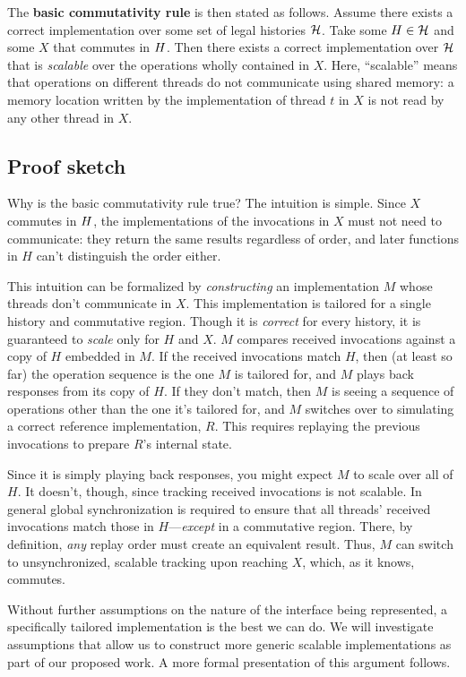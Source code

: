 The \textbf{basic commutativity rule} is then stated as follows.
%
Assume there exists a correct implementation over some set of legal
histories $\mathcal{H}$.
%
Take some $H \in \mathcal{H}$ and some $X$ that commutes in
$H$.
%
Then there exists a correct implementation over $\mathcal{H}$
that is \emph{scalable} over the operations wholly
contained in $X$.
%
Here, ``scalable'' means that operations on different threads do not
communicate using shared memory: a memory location written by the
implementation of thread $t$ in $X$ is not read by any other thread in
$X$.


\subsection{Proof sketch}

Why is the basic commutativity rule true?
%
The intuition is simple.
%
Since $X$ commutes in $H$, the implementations of the
invocations in $X$ must not need to communicate: they return the same
results regardless of order, and later functions in $H$ can't
distinguish the order either.

This intuition can be formalized by \emph{constructing} an
implementation $M$
whose threads don't communicate in $X$.
%
This implementation is tailored for a single history and
commutative region. Though it is \emph{correct} for every history, it is
guaranteed to \emph{scale} only for $H$ and $X$.
%
$M$ compares received invocations against a copy of $H$
embedded in $M$.
%
If the received invocations match $H$,
then (at least so far) the operation sequence is the one
$M$ is tailored for, and $M$
plays back responses from its copy of $H$.
%
If they don't match, then $M$ is seeing a
sequence of operations other than the one it's tailored for,
and $M$ switches over to
simulating a correct reference implementation, $R$.
%
This requires replaying the previous invocations to prepare $R$'s
internal state.

Since it is simply playing back responses, you might
expect $M$ to scale over all of $H$.
%
It doesn't, though, since tracking received invocations is not scalable.
%
In general global synchronization is required to ensure that all
threads' received invocations match those in $H$---\emph{except} in a
commutative region.
%
There, by definition, \emph{any} replay order must create an equivalent
result. Thus, $M$ can switch to unsynchronized, scalable tracking upon
reaching $X$, which, as it knows, commutes.

Without further assumptions on the nature of the interface being
represented, a specifically tailored implementation is the best we can
do.
%
We will investigate assumptions that allow us to construct more generic
scalable implementations as part of our proposed work.
%
A more formal presentation of this argument follows.

